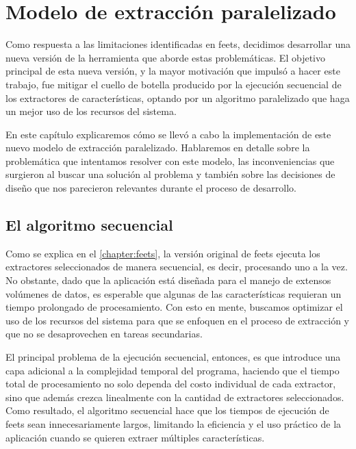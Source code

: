 \chapter[Modelo de extracción paralelizado]{
    Modelo de extracción paralelizado
}
\label{chapter:parallel}

Como respuesta a las limitaciones identificadas en \gls{feets}, decidimos desarrollar una nueva versión de la herramienta que aborde estas problemáticas. El objetivo principal de esta nueva versión, y la mayor motivación que impulsó a hacer este trabajo, fue mitigar el cuello de botella producido por la ejecución secuencial de los extractores de características, optando por un algoritmo paralelizado que haga un mejor uso de los recursos del sistema.

En este capítulo explicaremos cómo se llevó a cabo la implementación de este nuevo modelo de extracción paralelizado. Hablaremos en detalle sobre la problemática que intentamos resolver con este modelo, las inconveniencias que surgieron al buscar una solución al problema y también sobre las decisiones de diseño que nos parecieron relevantes durante el proceso de desarrollo.

\section{El algoritmo secuencial}

Como se explica en el \autoref{chapter:feets}, la versión original de \gls{feets} ejecuta los extractores seleccionados de manera secuencial, es decir, procesando uno a la vez. No obstante, dado que la aplicación está diseñada para el manejo de extensos volúmenes de datos, es esperable que algunas de las características requieran un tiempo prolongado de procesamiento. Con esto en mente, buscamos optimizar el uso de los recursos del sistema para que se enfoquen en el proceso de extracción y que no se desaprovechen en tareas secundarias.

El principal problema de la ejecución secuencial, entonces, es que introduce una capa adicional a la complejidad temporal del programa, haciendo que el tiempo total de procesamiento no solo dependa del costo individual de cada extractor, sino que además crezca linealmente con la cantidad de extractores seleccionados. Como resultado, el algoritmo secuencial hace que los tiempos de ejecución de \gls{feets} sean innecesariamente largos, limitando la eficiencia y el uso práctico de la aplicación cuando se quieren extraer múltiples características.

